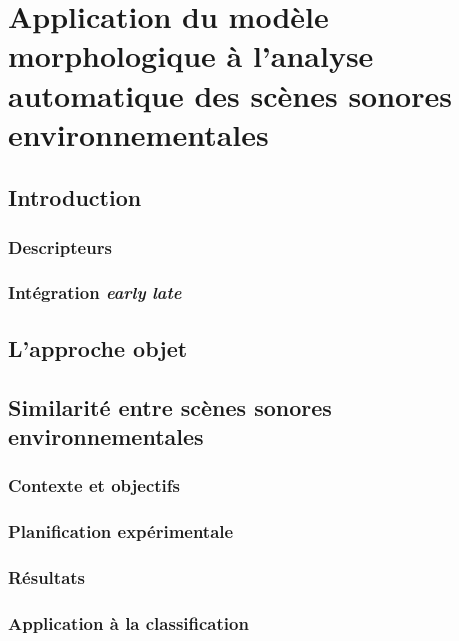 \chapter[Application du modèle à l’analyse automatique]{Application du modèle morphologique à l’analyse automatique des scènes sonores environnementales}\label{ch:ml_xp}

\section{Introduction}

\subsection{Descripteurs}

\subsection{Intégration \emph{early} \vs \emph{late}}

\section{L'approche objet}

\section{Similarité entre scènes sonores environnementales}

\subsection{Contexte et objectifs}


\subsection{Planification expérimentale}

\subsection{Résultats}

\subsection{Application à la classification}





